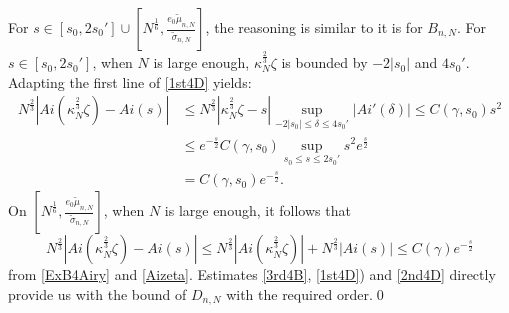 \documentclass[11pt]{article}
\numberwithin{equation}{section}%
\numberwithin{theorem}{section}
\begin{document}
     For $s\in[s_0,2s_0']\cup\left[N^\frac{1}{6},\frac{e_0\tilde\mu_{n,N}}{\tilde\sigma_{n,N}}\right]$, the reasoning is similar to it is for $B_{n,N}$. For $s\in[s_0,2s_0']$, when $N$ is large enough, $\kappa_N^\frac{2}{3}\zeta$ is bounded by $-2|s_0|$ and $4s_0'$. Adapting the first line of \eqref{1st4D} yields:
     \begin{equation}\label{2nd4D}
         \begin{split}
             N^{\frac{2}{3}}\left|Ai\left(\kappa_N^\frac{2}{3}\zeta\right)-Ai(s)\right|&\le N^\frac{2}{3}\left|\kappa_N^\frac{2}{3}\zeta-s\right|\sup_{-2|s_0|\le\delta\le4s_0'}|Ai'(\delta)|\le C(\gamma,s_0)s^2\\&\le e^{-\frac{s}{2}} C(\gamma,s_0)\sup_{s_0\le s\le2s_0'}s^2e^{\frac{s}{2}}\\&=C(\gamma,s_0)e^{-\frac{s}{2}}.
         \end{split}
     \end{equation}
     On $\left[N^\frac{1}{6},\frac{e_0\tilde\mu_{n,N}}{\tilde\sigma_{n,N}}\right]$, when $N$ is large enough, it follows that
     \begin{equation}\label{3rd4D}
         N^\frac{2}{3}\left|Ai\left(\kappa_N^\frac{2}{3}\zeta\right)-Ai(s)\right|\le N^\frac{2}{3}\left|Ai\left(\kappa_N^\frac{2}{3}\zeta\right)\right|+N^\frac{2}{3}\left|Ai(s)\right|\le C(\gamma)e^{-\frac{s}{2}}
     \end{equation}
     from \eqref{ExB4Airy} and \eqref{Aizeta}. Estimates \eqref{3rd4B}, \eqref{1st4D}) and \eqref{2nd4D} directly provide us with the bound of $D_{n,N}$ with the required order.\qed
     
\end{document}
